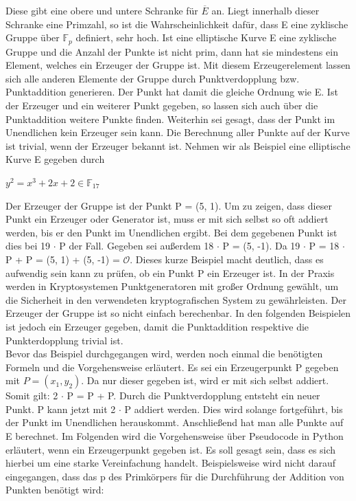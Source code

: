 Diese gibt eine obere und untere Schranke für $\overline{E}$ an. Liegt innerhalb dieser Schranke eine Primzahl, so ist die Wahrscheinlichkeit dafür, dass E eine zyklische Gruppe über $\mathbb{F}_{p}$ definiert, sehr hoch. Ist eine elliptische Kurve E eine zyklische Gruppe und die Anzahl der Punkte ist nicht prim, dann hat sie mindestens ein Element, welches ein Erzeuger der Gruppe ist. Mit diesem Erzeugerelement lassen sich alle anderen Elemente der Gruppe durch Punktverdopplung bzw. Punktaddition generieren. Der Punkt hat damit die gleiche Ordnung wie E. Ist der Erzeuger und ein weiterer Punkt gegeben, so lassen sich auch über die Punktaddition weitere Punkte finden. Weiterhin sei gesagt, dass der Punkt im Unendlichen kein Erzeuger sein kann. Die Berechnung aller Punkte auf der Kurve ist trivial, wenn der Erzeuger bekannt ist. Nehmen wir als Beispiel eine elliptische Kurve E gegeben durch
\begin{center}
$y^{2} =  x^{3} + 2x + 2 \in \mathbb{F}_{17}$
\end{center}

Der Erzeuger der Gruppe ist der Punkt P = (5, 1). Um zu zeigen, dass dieser Punkt ein Erzeuger oder Generator ist, muss er mit sich selbst so oft addiert werden, bis er den Punkt im Unendlichen ergibt. Bei dem gegebenen Punkt ist dies bei 19 $\cdot$ P der Fall. Gegeben sei außerdem 18 $\cdot$ P = (5, -1). Da 19 $\cdot$ P = 18 $\cdot$ P + P = (5, 1) + (5, -1) = $\mathcal O$. Dieses kurze Beispiel macht deutlich, dass es aufwendig sein kann zu prüfen, ob ein Punkt P ein Erzeuger ist. In der Praxis werden in Kryptosystemen Punktgeneratoren mit großer Ordnung gewählt, um die Sicherheit in den verwendeten kryptografischen System zu gewährleisten. Der Erzeuger der Gruppe ist so nicht einfach berechenbar. In den folgenden Beispielen ist jedoch ein Erzeuger gegeben, damit die Punktaddition respektive die Punkterdopplung trivial ist.\\

Bevor das Beispiel durchgegangen wird, werden noch einmal die benötigten Formeln und die Vorgehensweise erläutert. Es sei ein Erzeugerpunkt P gegeben mit $P = (x_1, y_2)$. Da nur dieser gegeben ist, wird er mit sich selbst addiert. Somit gilt: 2 $\cdot$ P = P + P. Durch die Punktverdopplung entsteht ein neuer Punkt. P kann jetzt mit 2 $\cdot$ P addiert werden. Dies wird solange fortgeführt, bis der Punkt im Unendlichen herauskommt. Anschließend hat man alle Punkte auf E berechnet. Im Folgenden wird die Vorgehensweise über Pseudocode in Python erläutert, wenn ein Erzeugerpunkt gegeben ist. Es soll gesagt sein, dass es sich hierbei um eine starke Vereinfachung handelt. Beispielsweise wird nicht darauf eingegangen, dass das p des Primkörpers für die Durchführung der Addition von Punkten benötigt wird:\\

